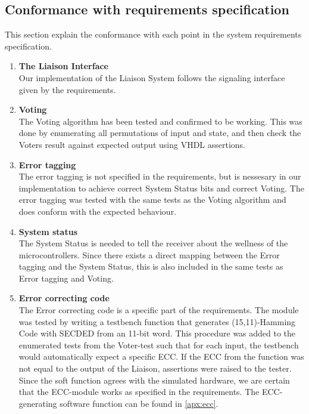 \subsection{Conformance with requirements specification}
This section explain the conformance with each point in the system requirements specification.
\begin{enumerate}
\item{\textbf{The Liaison Interface}} \hfill\\
    Our implementation of the Liaison System follows the signaling interface given by the requirements\cite{task}.

\item{\textbf{Voting}} \hfill\\
    The Voting algorithm has been tested and confirmed to be working. This was done by enumerating all
    permutations of input and state, and then check the Voters result against expected output using
    VHDL assertions.

\item{\textbf{Error tagging}} \hfill\\
    The error tagging is not specified in the requirements, but is nessesary in our implementation to
    achieve correct System Status bits and correct Voting. The error tagging was tested with the same
    tests as the Voting algorithm and does conform with the expected behaviour.

\item{\textbf{System status}} \hfill\\
    The System Status is needed to tell the receiver about the wellness of the microcontrollers. Since
    there exists a direct mapping between the Error tagging and the System Status, this is also
    included in the same tests as Error tagging and Voting.

\item{\textbf{Error correcting code}} \hfill\\
    The Error correcting code is a specific part of the requirements\cite{task}. The module was tested by writing
    a testbench function that generates (15,11)-Hamming Code with SECDED from an 11-bit word. This
    procedure was added to the enumerated tests from the Voter-test such that for each input, the testbench
    would automatically expect a specific ECC. If the ECC from the function was not equal to the output
    of the Liaison, assertions were raised to the tester. Since the soft function agrees with the simulated
    hardware, we are certain that the ECC-module works as specified in the requirements. The ECC-generating
    software function can be found in \autoref{apx:ecc}.


\end{enumerate}
